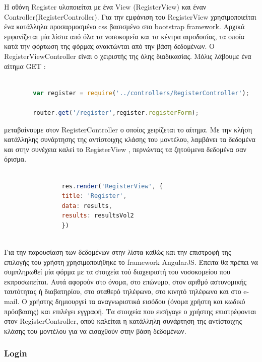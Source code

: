 		Η οθόνη Register υλοποιείται με ένα View (RegisterView) και έναν Controller(RegisterController). Για την εμφάνιση του RegisterView χρησιμοποιείται ένα κατάλληλα προσαρμοσμένο css βασισμένο στο bootstrap framework. Αρχικά εμφανίζεται μία λίστα από όλα τα νοσοκομεία και τα κέντρα αιμοδοσίας, τα οποία κατά την φόρτωση της φόρμας ανακτώνται από την βάση δεδομένων. O RegisterViewController είναι ο χειριστής της όλης διαδικασίας. Μόλις λάβουμε ένα αίτημα GET :
		
		\begin{lstlisting}[language=Javascript]			
		
		var register = require('../controllers/RegisterController');
		
		router.get('/register',register.registerForm);  


		\end{lstlisting}
		

μεταβαίνουμε στον RegisterController ο οποίος χειρίζεται το αίτημα. Με την κλήση κατάλληλης συνάρτησης της αντίστοιχης κλάσης του μοντέλου, λαμβάνει τα δεδομένα και στην συνέχεια καλεί το RegisterView , περνώντας τα ζητούμενα δεδομένα σαν όρισμα.



		\begin{lstlisting}[language=Javascript]			
		
	            res.render('RegisterView', { 
                title: 'Register',
                data: results,
                results: resultsVol2
				})
				
		\end{lstlisting}


	Για την παρουσίαση των δεδομένων στην λίστα καθώς και την επιστροφή της επιλογής του χρήστη χρησιμοποιήθηκε το framework AngularJS. Έπειτα θα πρέπει να συμπληρωθεί μία φόρμα με τα στοιχεία τού διαχειριστή του νοσοκομείου που εκπροσωπείται. Αυτά αφορούν στο όνομα, στο επώνυμο, στον αριθμό αστυνομικής ταυτότητας ή διαβατηρίου, στο σταθερό τηλέφωνο, στο κινητό τηλέφωνο και στο e-mail. Ο χρήστης δημιουργεί τα αναγνωριστικά εισόδου (όνομα χρήστη και κωδικό πρόσβασης) και επιλέγει εγγραφή.  Τα στοιχεία που εισήγαγε ο χρήστης επιστρέφονται στον RegisterController, οπού καλείται η κατάλληλη συνάρτηση της αντίστοιχης κλάσης του μοντέλου για να εισαχθούν στην βάση δεδομένων.
	
	
		\subsubsection{Login}
		
